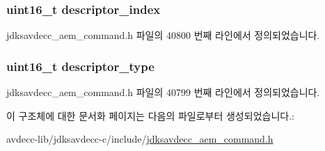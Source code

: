 \subsubsection[{\texorpdfstring{descriptor\+\_\+index}{descriptor_index}}]{\setlength{\rightskip}{0pt plus 5cm}uint16\+\_\+t descriptor\+\_\+index}\hypertarget{structjdksavdecc__aem__command__deauthenticate__response_a042bbc76d835b82d27c1932431ee38d4}{}\label{structjdksavdecc__aem__command__deauthenticate__response_a042bbc76d835b82d27c1932431ee38d4}


jdksavdecc\+\_\+aem\+\_\+command.\+h 파일의 40800 번째 라인에서 정의되었습니다.

\subsubsection[{\texorpdfstring{descriptor\+\_\+type}{descriptor_type}}]{\setlength{\rightskip}{0pt plus 5cm}uint16\+\_\+t descriptor\+\_\+type}\hypertarget{structjdksavdecc__aem__command__deauthenticate__response_ab7c32b6c7131c13d4ea3b7ee2f09b78d}{}\label{structjdksavdecc__aem__command__deauthenticate__response_ab7c32b6c7131c13d4ea3b7ee2f09b78d}


jdksavdecc\+\_\+aem\+\_\+command.\+h 파일의 40799 번째 라인에서 정의되었습니다.



이 구조체에 대한 문서화 페이지는 다음의 파일로부터 생성되었습니다.\+:\begin{DoxyCompactItemize}
\item 
avdecc-\/lib/jdksavdecc-\/c/include/\hyperlink{jdksavdecc__aem__command_8h}{jdksavdecc\+\_\+aem\+\_\+command.\+h}\end{DoxyCompactItemize}
